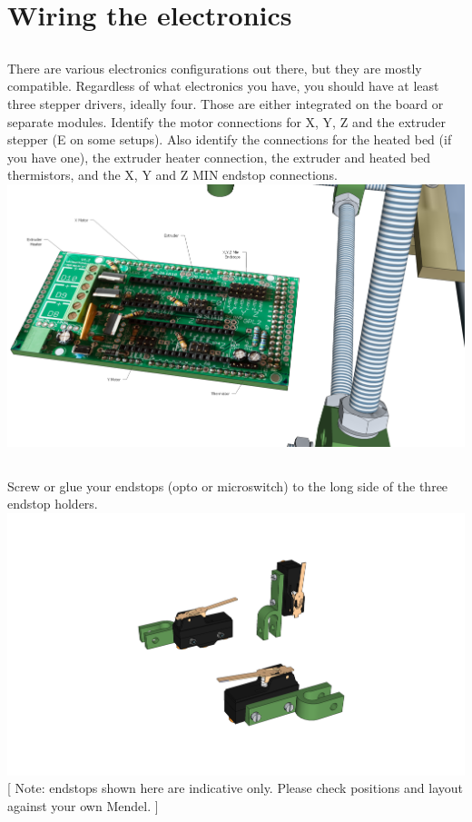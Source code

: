 \documentclass[twoside,a4paper,titlepage]{memoir}
\begin{document}
	\chapter{Wiring the electronics}

	\section{}
	There are various electronics configurations out there, but they are mostly compatible. Regardless of
	what electronics you have, you should have at least three stepper drivers, ideally four. Those are either
	integrated on the board or separate modules. Identify the motor connections for X, Y, Z and the
	extruder stepper (E on some setups). Also identify the connections for the heated bed (if you have one),
	the extruder heater connection, the extruder and heated bed thermistors, and the X, Y and Z MIN
	endstop connections.\\
	\includegraphics[width=1\linewidth]{graphics/ch10_1.png}
	
	\section{}
	Screw or glue your endstops (opto or microswitch) to the long side of the three endstop holders.\\
	\includegraphics[width=1\linewidth]{graphics/ch10_2.png}	
	[ Note: endstops shown here are indicative only. Please check positions and layout against your own Mendel. ]
	
\end{document}
